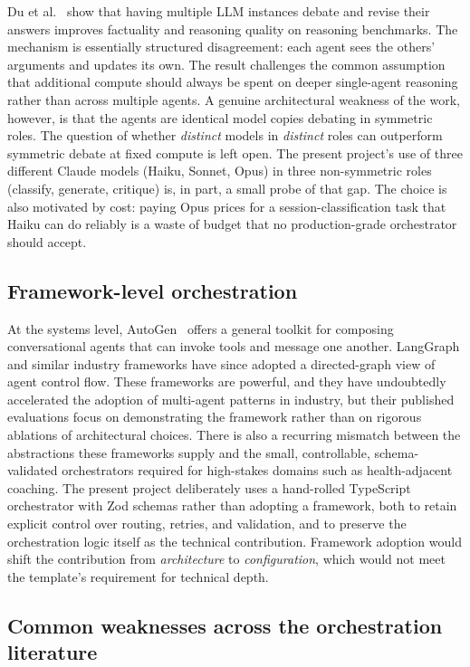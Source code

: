 Du et al.~\cite{du2023debate} show that having multiple LLM instances debate and revise their answers improves factuality and reasoning quality on reasoning benchmarks. The mechanism is essentially structured disagreement: each agent sees the others' arguments and updates its own. The result challenges the common assumption that additional compute should always be spent on deeper single-agent reasoning rather than across multiple agents. A genuine architectural weakness of the work, however, is that the agents are identical model copies debating in symmetric roles. The question of whether \emph{distinct} models in \emph{distinct} roles can outperform symmetric debate at fixed compute is left open. The present project's use of three different Claude models (Haiku, Sonnet, Opus) in three non-symmetric roles (classify, generate, critique) is, in part, a small probe of that gap. The choice is also motivated by cost: paying Opus prices for a session-classification task that Haiku can do reliably is a waste of budget that no production-grade orchestrator should accept.

\subsection{Framework-level orchestration}

At the systems level, AutoGen~\cite{wu2023autogen} offers a general toolkit for composing conversational agents that can invoke tools and message one another. LangGraph and similar industry frameworks have since adopted a directed-graph view of agent control flow. These frameworks are powerful, and they have undoubtedly accelerated the adoption of multi-agent patterns in industry, but their published evaluations focus on demonstrating the framework rather than on rigorous ablations of architectural choices. There is also a recurring mismatch between the abstractions these frameworks supply and the small, controllable, schema-validated orchestrators required for high-stakes domains such as health-adjacent coaching. The present project deliberately uses a hand-rolled TypeScript orchestrator with Zod schemas rather than adopting a framework, both to retain explicit control over routing, retries, and validation, and to preserve the orchestration logic itself as the technical contribution. Framework adoption would shift the contribution from \emph{architecture} to \emph{configuration}, which would not meet the template's requirement for technical depth.

\subsection{Common weaknesses across the orchestration literature}

